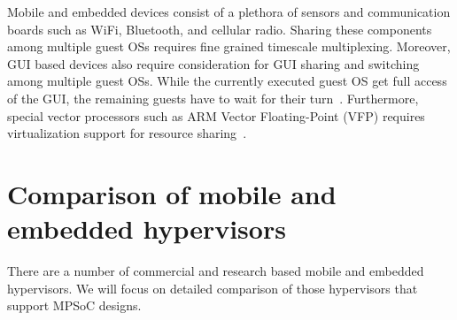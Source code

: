 \documentclass[journal, 10pt]{IEEEtran}
\begin{document}
Mobile and embedded devices consist of a plethora of sensors and communication boards such as WiFi, Bluetooth, and cellular radio. Sharing these components among multiple guest OSs requires fine grained timescale multiplexing. Moreover, GUI based devices also require consideration for GUI sharing and switching among multiple guest OSs. While the currently executed guest OS get full access of the GUI, the remaining guests have to wait for their turn~\cite{Barr2010}. Furthermore, special vector processors such as ARM Vector Floating-Point (VFP) requires virtualization support for resource sharing~\cite{Yoo2013}. 

\section{Comparison of mobile and embedded hypervisors}\label{sec:hyp}
There are a number of commercial and research based mobile and embedded hypervisors. We will focus on detailed comparison of those hypervisors that support MPSoC designs. 
\end{document}
